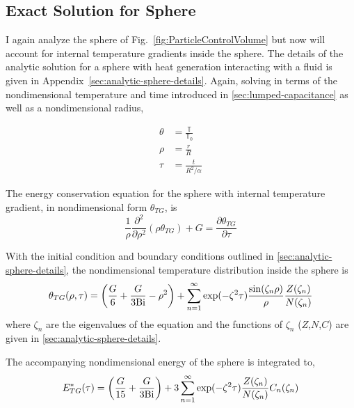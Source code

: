 \subsection{Exact Solution for Sphere}\label{sec:analytic-sphere}

I again analyze the sphere of Fig.~\ref{fig:ParticleControlVolume} but now will account for internal temperature gradients inside the sphere. The details of the analytic solution for a sphere with heat generation interacting with a fluid is given in Appendix~\ref{sec:analytic-sphere-details}. Again, solving in terms of the nondimensional temperature and time introduced in \cref{sec:lumped-capacitance} as well as a nondimensional radius,

\begin{align*}
    \theta &= \frac{\mathbb{T}}{\mathbb{T}_0}\\
    \rho & = \frac{r}{R}\\
    \tau & = \frac{t}{R^2/\alpha}
\end{align*}

The energy conservation equation for the sphere with internal temperature gradient, in nondimensional form $\theta_{TG}$, is
\begin{equation}
    \frac{1}{\rho}\frac{\partial^2}{\partial \rho^2}(\rho\theta_{TG}) + G = \frac{\partial\theta_{TG}}{\partial \tau}
\end{equation}

With the initial condition and boundary conditions outlined in \cref{sec:analytic-sphere-details}, the nondimensional temperature distribution inside the sphere is 
\begin{equation}\label{eq:analytic-temperature-distribution}
    \theta_{TG}(\rho,\tau) = \left(\frac{G}{6} + \frac{G}{3\mathrm{Bi}}-\rho^2\right)  +   \sum_{n=1}^\infty \exp(-\zeta^2 \tau) \frac{\sin(\zeta_n \rho)}{\rho} \frac{Z(\zeta_n)}{N(\zeta_n)}  
\end{equation}
where $\zeta_n$ are the eigenvalues of the equation and the functions of $\zeta_n$ ($Z$,$N$,$C$) are given in \cref{sec:analytic-sphere-details}.

The accompanying nondimensional energy of the sphere is integrated to,
\begin{equation}
\label{eq:analytic-energy-profile}
    E^*_{TG}(\tau)=\left(\frac{G}{15}+\frac{G}{3\mathrm{Bi}}\right)+3\sum_{n=1}^\infty \exp(-\zeta^2 \tau) \frac{Z(\zeta_n)}{N(\zeta_n)} C_n(\zeta_n)
\end{equation}

